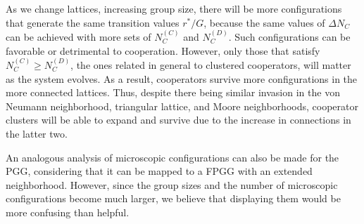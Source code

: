 \documentclass[5p,review]{elsarticle}
\begin{document}
As we change lattices, increasing group size, there will be more configurations that generate the same transition values $r^*/G$, because the same values of $\Delta N_C $ can be achieved with more sets of $N^{{\scriptscriptstyle(C)}}_C$ and $N^{{\scriptscriptstyle(D)}}_C$. Such configurations can be favorable or detrimental to cooperation. However, only those that satisfy $N^{{\scriptscriptstyle(C)}}_C \geqslant N^{{\scriptscriptstyle(D)}}_C$, the ones related in general to clustered cooperators,  will matter as the system evolves. As a result, cooperators survive more configurations in the more connected lattices.
Thus, despite there being similar invasion in the von Neumann neighborhood, triangular lattice, and Moore neighborhoods, cooperator clusters will be able to expand and survive due to the increase in connections in the latter two. 
%

An analogous analysis of microscopic configurations can also be made for the PGG, considering that it can be mapped to a FPGG with an extended neighborhood. However, since the group sizes and the number of microscopic configurations become much larger, we believe that displaying them would be more confusing than helpful.

\end{document}
